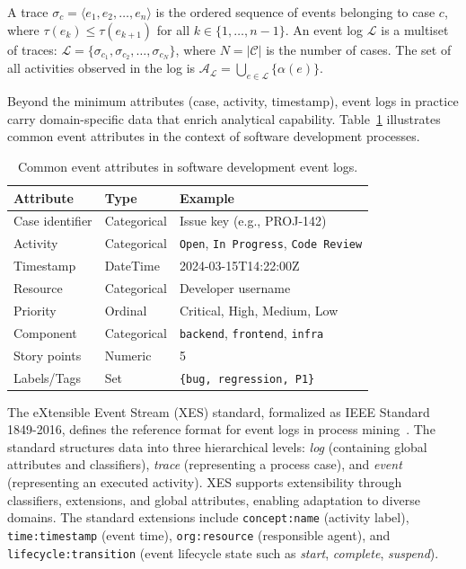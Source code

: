 \begin{definition}
\label{def:event-log}
A trace $\sigma_c = \langle e_1, e_2, \ldots, e_n \rangle$ is the ordered
sequence of events belonging to case $c$, where
$\tau(e_k) \leq \tau(e_{k+1})$ for all $k \in \{1, \ldots, n-1\}$. An
event log $\mathcal{L}$ is a multiset of traces:
$\mathcal{L} = \{\sigma_{c_1}, \sigma_{c_2}, \ldots, \sigma_{c_N}\}$,
where $N = |\mathcal{C}|$ is the number of cases. The set of all
activities observed in the log is
$\mathcal{A}_\mathcal{L} = \bigcup_{e \in \mathcal{L}} \{\alpha(e)\}$.
\end{definition}

Beyond the minimum attributes (case, activity, timestamp), event logs in
practice carry domain-specific data that enrich analytical capability.
Table~\ref{tab:event-attributes} illustrates common event attributes in
the context of software development processes.

\begin{table}[htb]
\centering
\caption{Common event attributes in software development event logs.}
\label{tab:event-attributes}
\begin{tabular}{lll}
\toprule
\textbf{Attribute} & \textbf{Type} & \textbf{Example} \\
\midrule
Case identifier & Categorical & Issue key (e.g., PROJ-142) \\
Activity & Categorical & \texttt{Open}, \texttt{In Progress}, \texttt{Code Review} \\
Timestamp & DateTime & 2024-03-15T14:22:00Z \\
Resource & Categorical & Developer username \\
Priority & Ordinal & Critical, High, Medium, Low \\
Component & Categorical & \texttt{backend}, \texttt{frontend}, \texttt{infra} \\
Story points & Numeric & 5 \\
Labels/Tags & Set & \texttt{\{bug, regression, P1\}} \\
\bottomrule
\end{tabular}
\end{table}

The eXtensible Event Stream (XES) standard, formalized as IEEE Standard
1849-2016, defines the reference format for event logs in process
mining~\cite{xes2016}. The standard structures data into three
hierarchical levels: \emph{log} (containing global attributes and
classifiers), \emph{trace} (representing a process case), and \emph{event}
(representing an executed activity). XES supports extensibility through
classifiers, extensions, and global attributes, enabling adaptation to
diverse domains. The standard extensions include \texttt{concept:name}
(activity label), \texttt{time:timestamp} (event time),
\texttt{org:resource} (responsible agent), and \texttt{lifecycle:transition}
(event lifecycle state such as \emph{start}, \emph{complete}, \emph{suspend}).

